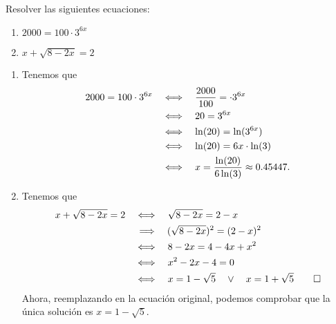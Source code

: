 \documentclass[10pt,respuestas,a4]{aleph-examen}
\begin{document}
\encabezado

\begin{preguntas}
\item
    Resolver las siguientes ecuaciones:
    \begin{multicols}{2}
        \begin{enumerate}[label=\textit{\alph*)}]
            \item
                $ 2000 = 100 \cdot 3^{6x}$
            \item
                $x+\sqrt{8-2x}=2$
        \end{enumerate}    
    \end{multicols}

\begin{respuesta}
    \begin{enumerate}[label=\textit{\alph*)},leftmargin=*]
    \item
        Tenemos que
        \begin{align*}
            2000 = 100 \cdot 3^{6x}
            & \quad\Longleftrightarrow\quad \frac{2000}{100} = \cdot 3^{6x}\\
            & \quad\Longleftrightarrow\quad 20 =  3^{6x}\\
            & \quad\Longleftrightarrow\quad \ln(20) = \ln(3^{6x})\\
            & \quad\Longleftrightarrow\quad \ln(20) = 6x\cdot\ln(3)\\
            & \quad\Longleftrightarrow\quad x = \frac{\ln(20)}{6\ln(3)} \approx 0.45447.
        \end{align*}
    \item
        Tenemos que
        \begin{align*}
            x + \sqrt{8 - 2x} = 2
            & \quad\Longleftrightarrow\quad \sqrt{8 - 2x} = 2 - x\\
            & \,\quad\Longrightarrow\quad (\sqrt{8 - 2x})^2 = (2 - x)^2\\
            & \quad\Longleftrightarrow\quad 8 - 2x = 4 - 4x + x^2\\
            & \quad\Longleftrightarrow\quad x^2 - 2x - 4 = 0\\
            & \quad\Longleftrightarrow\quad x = 1-\sqrt{5} \quad \lor \quad x = 1+\sqrt{5}\qedhere
        \end{align*}
        Ahora, reemplazando en la ecuación original, podemos comprobar que la única solución es $x = 1-\sqrt{5}$.
    \end{enumerate}
\end{respuesta}

\end{preguntas}
\end{document}
